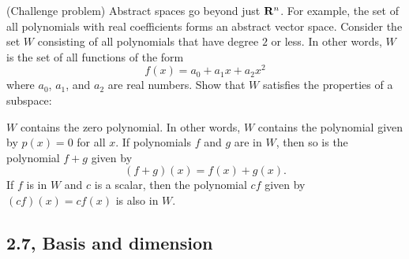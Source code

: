 \begin{problems}
  \problem (Challenge problem) Abstract spaces go beyond just
  ${\bf R}^n$.  For example, the set of all polynomials with real
  coefficients forms an abstract vector space.  \newline \newline %
  Consider the set $W$ consisting of all polynomials that have degree
  $2$ or less.  In other words, $W$ is the set of all functions of the
  form
  \[f(x) = a_0 + a_1 x + a_2 x^2\]
  where $a_0$, $a_1$, and $a_2$ are real numbers.
  Show that $W$ satisfies the properties of a subspace:
  \begin{subproblems}
    \subproblem $W$ contains the zero polynomial.  In other words, $W$
    contains the polynomial given by $p(x) = 0$ for all $x$.
    \subproblem If polynomials $f$ and $g$ are in $W$, then so is the
    polynomial $f+g$ given by \[(f+g)(x) = f(x) + g(x).\]
    \subproblem If $f$ is in $W$ and $c$ is a scalar, then the
    polynomial $cf$ given by $(cf)(x) = cf(x)$ is also in $W$.
  \end{subproblems}

\end{problems}\setcounter{problem}{0}

\newpage

\subsection{2.7, Basis and dimension}

